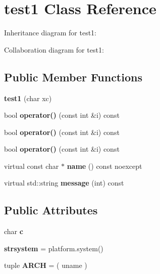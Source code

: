 \hypertarget{structtest1}{}\section{test1 Class Reference}
\label{structtest1}


Inheritance diagram for test1\+:


Collaboration diagram for test1\+:
\subsection*{Public Member Functions}
\begin{DoxyCompactItemize}
\item 
\mbox{\label{structtest1_a6ebe342b8bd9416777e5444331209c73}} 
{\bfseries test1} (char xc)
\item 
\mbox{\label{structtest1_a76c84043396a47c37722fbfbcccf3e9d}} 
bool {\bfseries operator()} (const int \&i) const
\item 
\mbox{\label{structtest1_a76c84043396a47c37722fbfbcccf3e9d}} 
bool {\bfseries operator()} (const int \&i) const
\item 
\mbox{\label{structtest1_a76c84043396a47c37722fbfbcccf3e9d}} 
bool {\bfseries operator()} (const int \&i) const
\item 
\mbox{\label{structtest1_af0a456dfb2fa8b125ec9926e8b302e6b}} 
virtual const char $\ast$ {\bfseries name} () const noexcept
\item 
\mbox{\label{structtest1_aa1678222dfc7410b2a111ee0d2bc8368}} 
virtual std\+::string {\bfseries message} (int) const
\end{DoxyCompactItemize}
\subsection*{Public Attributes}
\begin{DoxyCompactItemize}
\item 
\mbox{\label{structtest1_a6417b0e351eb8a55a507a418ed396118}} 
char {\bfseries c}
\item 
\mbox{\label{structtest1_a7e659d523a4d589b0fff734b8685cdab}} 
{\bfseries strsystem} = platform.\+system()
\item 
\mbox{\label{structtest1_a073fc9048d25d99ed1ef7960e4d4bf1d}} 
tuple {\bfseries A\+R\+CH} = ( uname )
\end{DoxyCompactItemize}


